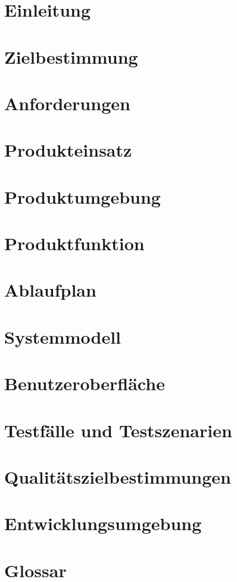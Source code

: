 

	
	\maketitle
	\setcounter{tocdepth}{1}
	\tableofcontents
	\chapter{Einleitung}
		
	\chapter{Zielbestimmung}
		
	\chapter{Anforderungen}
		
	\chapter{Produkteinsatz}
		
	\chapter{Produktumgebung}
		
	\chapter{Produktfunktion}
		
	\chapter{Ablaufplan}
		
	\chapter{Systemmodell}
		
	\chapter{Benutzeroberfläche}
		
	\chapter{Testfälle und Testszenarien}
		
	\chapter{Qualitätszielbestimmungen}
		
	\chapter{Entwicklungsumgebung}
		
	\chapter{Glossar}
		
